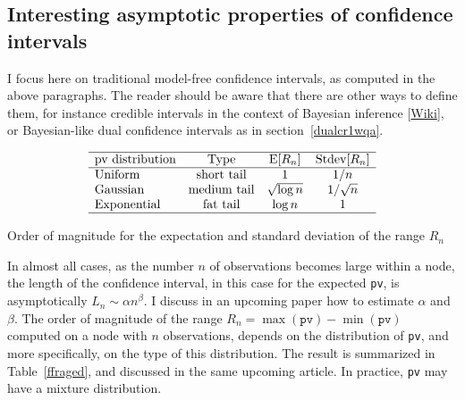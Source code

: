 \documentclass[oneside,10pt]{book}
\renewcommand{\arraystretch}{1.4} %
\begin{document}
\subsection{Interesting asymptotic properties of confidence intervals}

I focus here on traditional model-free confidence intervals, as computed in the above paragraphs. The reader should be aware that there are other ways to define them, for instance \textcolor{index}{credible intervals} in the context of
 \textcolor{index}{Bayesian inference} [\href{https://en.wikipedia.org/wiki/Bayesian_inference}{Wiki}], or
 Bayesian-like \textcolor{index}{dual confidence intervals} as in section~\ref{dualcr1wqa}.


\renewcommand{\arraystretch}{1.2} %
\begin{center}
\begin{table}[H]
\[
\begin{array}{lccc}
\hline
\text{pv distribution} & \text{Type} &  \text{E}[R_n] & \text{Stdev}[R_n] \\
\hline
\text{Uniform} & \text{short tail} & 1 & 1/n \\
\text{Gaussian} & \text{medium tail} & \sqrt{\log n} & 1/\sqrt{n} \\
\text{Exponential} & \text{fat tail} & \log n & 1\\
\hline
\end{array}
\]
\caption{\label{ffraged}Order of magnitude for the expectation and standard deviation of the range $R_n$}
\end{table}
\end{center}

\renewcommand{\arraystretch}{1.0} %

In almost all cases, as the number $n$ of observations becomes large within a node, the length of the confidence interval, in this case for the expected \texttt{pv}, is asymptotically
 $L_n\sim\alpha n^\beta$. I discuss in an upcoming paper how to estimate $\alpha$ and $\beta$. The order of magnitude of the range $R_n =\max(\texttt{pv}) - \min(\texttt{pv})$
  computed on a node with $n$ observations, depends on the distribution of \texttt{pv}, and more specifically, on the type of this distribution. The result is summarized in Table~\ref{ffraged}, and discussed in the same upcoming article. In practice, \texttt{pv} may have a \textcolor{index}{mixture  distribution}.
\end{document}
